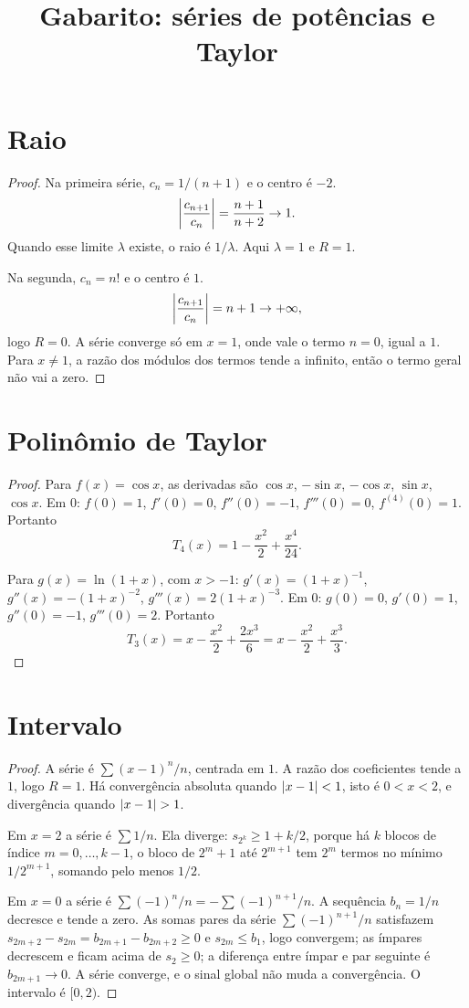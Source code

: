 \documentclass[11pt,a4paper]{article}
\title{Gabarito: séries de potências e Taylor}
\author{}
\date{}
\begin{document}
\maketitle
\tableofcontents

\section{Raio}

\begin{proof}
Na primeira série, \(c_n=1/(n+1)\) e o centro é \(-2\). 
\[
\left\lvert \frac{c_{n+1}}{c_n} \right\rvert=\frac{n+1}{n+2}\to 1.
\]
Quando esse limite \(\lambda\) existe, o raio é \(1/\lambda\). Aqui \(\lambda=1\) e \(R=1\).

Na segunda, \(c_n=n!\) e o centro é \(1\).
\[
\left\lvert \frac{c_{n+1}}{c_n} \right\rvert=n+1\to+\infty,
\]
logo \(R=0\). A série converge só em \(x=1\), onde vale o termo \(n=0\), igual a \(1\). Para \(x\neq 1\), a razão dos módulos dos termos tende a infinito, então o termo geral não vai a zero.
\end{proof}

\section{Polinômio de Taylor}

\begin{proof}
Para \(f(x)=\cos x\), as derivadas são \(\cos x\), \(-\sin x\), \(-\cos x\), \(\sin x\), \(\cos x\). Em \(0\): \(f(0)=1\), \(f'(0)=0\), \(f''(0)=-1\), \(f'''(0)=0\), \(f^{(4)}(0)=1\). Portanto
\[
T_4(x)=1-\frac{x^2}{2}+\frac{x^4}{24}.
\]

Para \(g(x)=\ln(1+x)\), com \(x>-1\): \(g'(x)=(1+x)^{-1}\), \(g''(x)=-(1+x)^{-2}\), \(g'''(x)=2(1+x)^{-3}\). Em \(0\): \(g(0)=0\), \(g'(0)=1\), \(g''(0)=-1\), \(g'''(0)=2\). Portanto
\[
T_3(x)=x-\frac{x^2}{2}+\frac{2x^3}{6}=x-\frac{x^2}{2}+\frac{x^3}{3}.
\]
\end{proof}

\section{Intervalo}

\begin{proof}
A série é \(\sum (x-1)^n/n\), centrada em \(1\). A razão dos coeficientes tende a \(1\), logo \(R=1\). Há convergência absoluta quando \(\left\lvert x-1 \right\rvert<1\), isto é \(0<x<2\), e divergência quando \(\left\lvert x-1 \right\rvert>1\).

Em \(x=2\) a série é \(\sum 1/n\). Ela diverge: \(s_{2^k}\ge 1+k/2\), porque há \(k\) blocos de índice \(m=0,\ldots,k-1\), o bloco de \(2^m+1\) até \(2^{m+1}\) tem \(2^m\) termos no mínimo \(1/2^{m+1}\), somando pelo menos \(1/2\).

Em \(x=0\) a série é \(\sum (-1)^n/n=-\sum (-1)^{n+1}/n\). A sequência \(b_n=1/n\) decresce e tende a zero. As somas pares da série \(\sum (-1)^{n+1}/n\) satisfazem \(s_{2m+2}-s_{2m}=b_{2m+1}-b_{2m+2}\ge 0\) e \(s_{2m}\le b_1\), logo convergem; as ímpares decrescem e ficam acima de \(s_2\ge 0\); a diferença entre ímpar e par seguinte é \(b_{2m+1}\to 0\). A série converge, e o sinal global não muda a convergência. O intervalo é \([0,2)\).
\end{proof}
\end{document}
